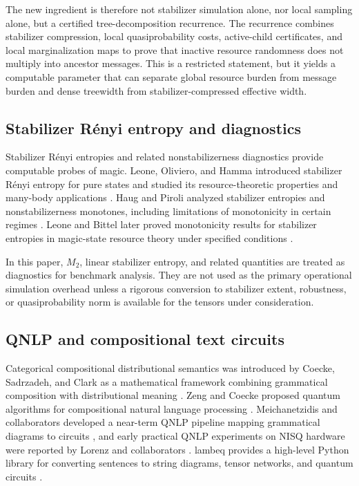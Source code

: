 The new ingredient is therefore not stabilizer simulation alone, nor local sampling alone, but a certified tree-decomposition recurrence. The recurrence combines stabilizer compression, local quasiprobability costs, active-child certificates, and local marginalization maps to prove that inactive resource randomness does not multiply into ancestor messages. This is a restricted statement, but it yields a computable parameter that can separate global resource burden from message burden and dense treewidth from stabilizer-compressed effective width.

\subsection{Stabilizer R\'enyi entropy and diagnostics}

Stabilizer R\'enyi entropies and related nonstabilizerness diagnostics provide computable probes of magic. Leone, Oliviero, and Hamma introduced stabilizer R\'enyi entropy for pure states and studied its resource-theoretic properties and many-body applications \citep{LeoneOlivieroHamma2022}. Haug and Piroli analyzed stabilizer entropies and nonstabilizerness monotones, including limitations of monotonicity in certain regimes \citep{HaugPiroli2023}. Leone and Bittel later proved monotonicity results for stabilizer entropies in magic-state resource theory under specified conditions \citep{LeoneBittel2024}.

In this paper, \(M_2\), linear stabilizer entropy, and related quantities are treated as diagnostics for benchmark analysis. They are not used as the primary operational simulation overhead unless a rigorous conversion to stabilizer extent, robustness, or quasiprobability norm is available for the tensors under consideration.

\subsection{QNLP and compositional text circuits}

Categorical compositional distributional semantics was introduced by Coecke, Sadrzadeh, and Clark as a mathematical framework combining grammatical composition with distributional meaning \citep{CoeckeSadrzadehClark2010}. Zeng and Coecke proposed quantum algorithms for compositional natural language processing \citep{ZengCoecke2016}. Meichanetzidis and collaborators developed a near-term QNLP pipeline mapping grammatical diagrams to circuits \citep{MeichanetzidisEtAl2020}, and early practical QNLP experiments on NISQ hardware were reported by Lorenz and collaborators \citep{LorenzEtAl2021}. lambeq provides a high-level Python library for converting sentences to string diagrams, tensor networks, and quantum circuits \citep{KartsaklisEtAl2021}.

